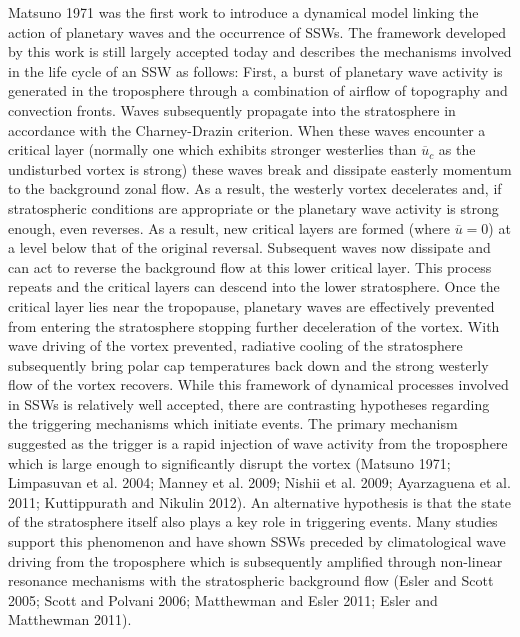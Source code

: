 Matsuno 1971 was the first work to introduce a dynamical model linking the action of planetary waves and the occurrence of SSWs. The framework developed by this work is still largely accepted today and describes the mechanisms involved in the life cycle of an SSW as follows: First, a burst of planetary wave activity is generated in the troposphere through a combination of airflow of topography and convection fronts. Waves subsequently propagate into the stratosphere in accordance with the Charney-Drazin criterion. When these waves encounter a critical layer (normally one which exhibits stronger westerlies than $\overline{u}_c$ as the undisturbed vortex is strong) these waves break and dissipate easterly momentum to the background zonal flow. As a result, the westerly vortex decelerates and, if stratospheric conditions are appropriate or the planetary wave activity is strong enough, even reverses. As a result, new critical layers are formed (where $\overline{u} = 0$) at a level below that of the original reversal. Subsequent waves now dissipate and can act to reverse the background flow at this lower critical layer. This process repeats and the critical layers can descend into the lower stratosphere. Once the critical layer lies near the tropopause, planetary waves are effectively prevented from entering the stratosphere stopping further deceleration of the vortex. With wave driving of the vortex prevented, radiative cooling of the stratosphere subsequently bring polar cap temperatures back down and the strong westerly flow of the vortex recovers. While this framework of dynamical processes involved in SSWs is relatively well accepted, there are contrasting hypotheses regarding the triggering mechanisms which initiate events. The primary mechanism suggested as the trigger is a rapid injection of wave activity from the troposphere which is large enough to significantly disrupt the vortex (Matsuno 1971; Limpasuvan et al. 2004; Manney et al. 2009; Nishii et al. 2009; Ayarzaguena et al. 2011; Kuttippurath and Nikulin 2012). An alternative hypothesis is that the state of the stratosphere itself also plays a key role in triggering events. Many studies support this phenomenon and have shown SSWs preceded by climatological wave driving from the troposphere which is subsequently amplified through non-linear resonance mechanisms with the stratospheric background flow (Esler and Scott 2005; Scott and Polvani 2006; Matthewman and Esler 2011; Esler and Matthewman 2011). 

